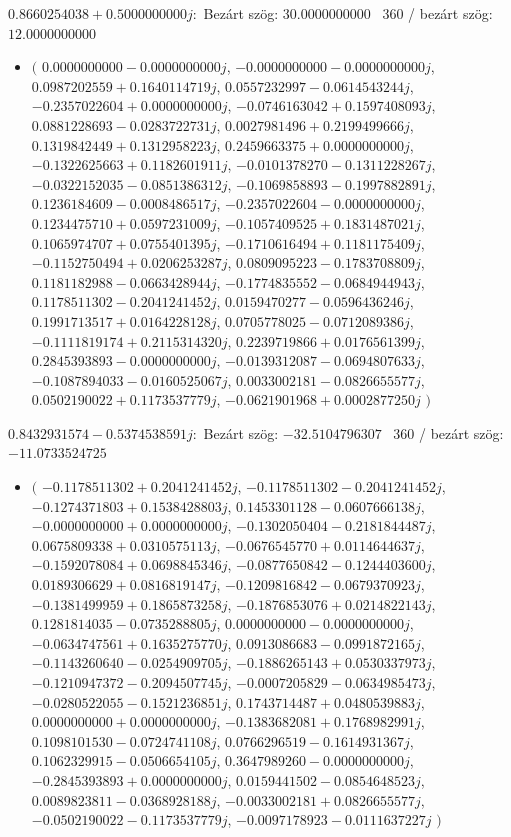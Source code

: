 \documentclass[14pt,a4paper]{article}
\begin{document}
$0.8660254038+0.5000000000j$:\
Bezárt szög: $30.0000000000$ \
360 / bezárt szög: $12.0000000000$\
\begin{itemize}
\item
$\big($
$0.0000000000-0.0000000000j$, $-0.0000000000-0.0000000000j$, $0.0987202559+0.1640114719j$, $0.0557232997-0.0614543244j$, $-0.2357022604+0.0000000000j$, $-0.0746163042+0.1597408093j$, $0.0881228693-0.0283722731j$, $0.0027981496+0.2199499666j$, $0.1319842449+0.1312958223j$, $0.2459663375+0.0000000000j$, $-0.1322625663+0.1182601911j$, $-0.0101378270-0.1311228267j$, $-0.0322152035-0.0851386312j$, $-0.1069858893-0.1997882891j$, $0.1236184609-0.0008486517j$, $-0.2357022604-0.0000000000j$, $0.1234475710+0.0597231009j$, $-0.1057409525+0.1831487021j$, $0.1065974707+0.0755401395j$, $-0.1710616494+0.1181175409j$, $-0.1152750494+0.0206253287j$, $0.0809095223-0.1783708809j$, $0.1181182988-0.0663428944j$, $-0.1774835552-0.0684944943j$, $0.1178511302-0.2041241452j$, $0.0159470277-0.0596436246j$, $0.1991713517+0.0164228128j$, $0.0705778025-0.0712089386j$, $-0.1111819174+0.2115314320j$, $0.2239719866+0.0176561399j$, $0.2845393893-0.0000000000j$, $-0.0139312087-0.0694807633j$, $-0.1087894033-0.0160525067j$, $0.0033002181-0.0826655577j$, $0.0502190022+0.1173537779j$, $-0.0621901968+0.0002877250j$
$\big)$
\end{itemize}
$0.8432931574-0.5374538591j$:\
Bezárt szög: $-32.5104796307$ \
360 / bezárt szög: $-11.0733524725$\
\begin{itemize}
\item
$\big($
$-0.1178511302+0.2041241452j$, $-0.1178511302-0.2041241452j$, $-0.1274371803+0.1538428803j$, $0.1453301128-0.0607666138j$, $-0.0000000000+0.0000000000j$, $-0.1302050404-0.2181844487j$, $0.0675809338+0.0310575113j$, $-0.0676545770+0.0114644637j$, $-0.1592078084+0.0698845346j$, $-0.0877650842-0.1244403600j$, $0.0189306629+0.0816819147j$, $-0.1209816842-0.0679370923j$, $-0.1381499959+0.1865873258j$, $-0.1876853076+0.0214822143j$, $0.1281814035-0.0735288805j$, $0.0000000000-0.0000000000j$, $-0.0634747561+0.1635275770j$, $0.0913086683-0.0991872165j$, $-0.1143260640-0.0254909705j$, $-0.1886265143+0.0530337973j$, $-0.1210947372-0.2094507745j$, $-0.0007205829-0.0634985473j$, $-0.0280522055-0.1521236851j$, $0.1743714487+0.0480539883j$, $0.0000000000+0.0000000000j$, $-0.1383682081+0.1768982991j$, $0.1098101530-0.0724741108j$, $0.0766296519-0.1614931367j$, $0.1062329915-0.0506654105j$, $0.3647989260-0.0000000000j$, $-0.2845393893+0.0000000000j$, $0.0159441502-0.0854648523j$, $0.0089823811-0.0368928188j$, $-0.0033002181+0.0826655577j$, $-0.0502190022-0.1173537779j$, $-0.0097178923-0.0111637227j$
$\big)$
\end{itemize}
\end{document}
